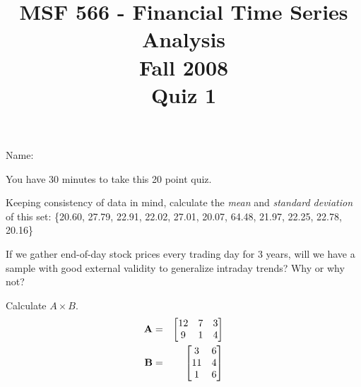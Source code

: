 \documentclass[11pt]{article}
\begin{document}
\title{MSF 566 - Financial Time Series Analysis \\ Fall 2008 \\ Quiz 1}
\date{}
\maketitle

{Name:} {\underline {\hspace{4.5in}}}
\vspace{2pc}

You have 30 minutes to take this 20 point quiz.
\vspace{2pc}

\begin{problem}{5}
\raggedright{Keeping consistency of data in mind, calculate the \emph{mean} and \emph{standard deviation} of this set:}\linebreak
\{20.60, 27.79, 22.91, 22.02, 27.01, 20.07, 64.48, 21.97, 22.25, 22.78, 20.16\}
\vspace{2pc}
\vfill
\end{problem}

\begin{problem}{5}
If we gather end-of-day stock prices every trading day for 3 years, will we have a sample with good external validity to generalize intraday trends? Why or why not?
\vspace{2pc}
\vfill
\end{problem}

\begin{problem}{5}
Calculate $A \times B$.
\begin{eqnarray}
\mathbf{A} &=& \notag
	\begin{bmatrix}
	12 & 7 & 3 \\
	9 & 1 & 4 \\
	\end{bmatrix} \\
\mathbf{B}&=&  \notag
	\begin{bmatrix}
	3 & 6 \\
	11 & 4 \\
	1 & 6 \\
	\end{bmatrix}
\end{eqnarray}
\vfill
\vfill
\end{problem}
\end{document}
